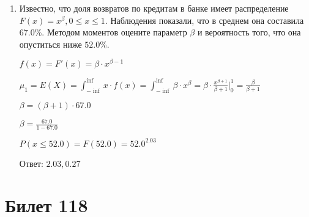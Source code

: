 \documentclass[a4paper,12pt]{article}
\begin{document}
\begin{enumerate}
\item

    
	Известно, что доля возвратов по кредитам в банке имеет распределение $F(x) = x^{\beta}, 0 \le x \le 1$. Наблюдения показали, что в среднем она составила $67.0$\%. Методом моментов оцените параметр $\beta$ и вероятность того, что она опуститься ниже $52.0$\%.
	


	

	$f(x) = F'(x) = \beta \cdot x^{\beta - 1}$

	$\mu_{1} = E(X) = \int_{-\inf}^{\inf}x \cdot f(x) = \int_{-\inf}^{\inf} \beta \cdot x^{\beta} = \beta \cdot \frac{x^{\beta + 1}}{\beta + 1}\bigg|_0^1 = \frac{\beta}{\beta + 1}$

	$\beta = (\beta + 1) \cdot 67.0$

	$\beta = \frac{67.0}{1 - 67.0}$

	$ P(x \le 52.0) = F(52.0) = 52.0^{2.03} $

    Ответ: $2.03, 0.27$
	


\end{enumerate}

\section{Билет 118}
\end{document}
